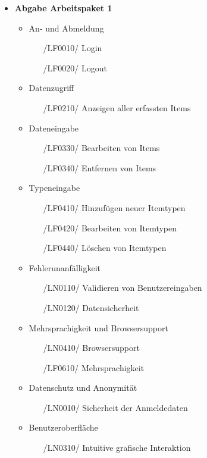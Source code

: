 \documentclass[11pt,a4paper]{report}
\begin{document}
\begin{itemize}
\item
  \textbf{Abgabe Arbeitspaket 1}
  
  \begin{itemize}
  	\item
  		An- und Abmeldung
  		\begin{itemize}
  		\leftskip=3em
  		\item[/LF0010/] Login
  		\item[/LF0020/] Logout
  		\end{itemize}
    \item
    	Datenzugriff
    	\begin{itemize}
    	\leftskip=3em
    	\item[/LF0210/] Anzeigen aller erfassten Items
    	\end{itemize}
   \item
    	Dateneingabe
    	\begin{itemize}
    	\leftskip=3em
    	\item[/LF0330/] Bearbeiten von Items
    	\item[/LF0340/] Entfernen von Items
    	\end{itemize}
  \item
    	Typeneingabe
    	\begin{itemize}
    	\leftskip=3em
    	\item[/LF0410/] Hinzufügen neuer Itemtypen
    	\item[/LF0420/] Bearbeiten von Itemtypen
    	\item[/LF0440/] Löschen von Itemtypen
    	\end{itemize}
  \item
  	Fehlerunanfälligkeit
  	\begin{itemize}
  	\leftskip=3em
  	\item[/LN0110/] Validieren von Benutzereingaben
  	\item[/LN0120/] Datensicherheit
  	\end{itemize}
  \item
  		Mehrsprachigkeit und Browsersupport
  	\begin{itemize}
  	\leftskip=3em
  	\item[/LN0410/] Browsersupport
  	\item[/LF0610/] Mehrsprachigkeit
  	\end{itemize}
  \item
  	Datenschutz und Anonymität
  	\begin{itemize}
  	\leftskip=3em
  	\item[/LN0010/] Sicherheit der Anmeldedaten
  	\end{itemize}
  \item
  	Benutzeroberfläche
  	\begin{itemize}
  	\leftskip=3em
  	\item[/LN0310/] Intuitive grafische Interaktion
  	\end{itemize}
  \end{itemize}


\end{itemize}
\end{document}
